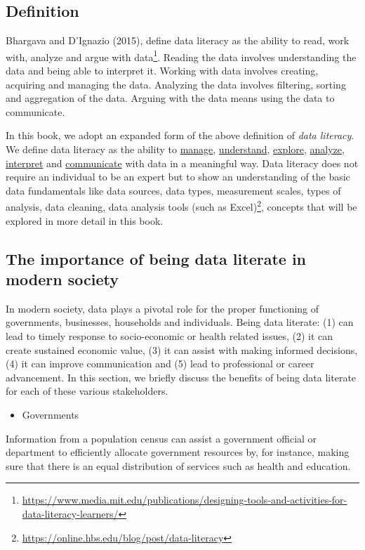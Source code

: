 \documentclass[
]{book}
\providecommand{\tightlist}{%
  \setlength{\itemsep}{0pt}\setlength{\parskip}{0pt}}
\begin{document}
\subsection{Definition}\label{definition}

Bhargava and D'Ignazio (2015), define data literacy as the ability to read, work with, analyze and argue with data\footnote{\url{https://www.media.mit.edu/publications/designing-tools-and-activities-for-data-literacy-learners/}}. Reading the data involves understanding the data and being able to interpret it. Working with data involves creating, acquiring and managing the data. Analyzing the data involves filtering, sorting and aggregation of the data. Arguing with the data means using the data to communicate.

In this book, we adopt an expanded form of the above definition of \emph{data literacy}. We define data literacy as the ability to \ul{manage}, \ul{understand}, \ul{explore}, \ul{analyze}, \ul{interpret} and \ul{communicate} with data in a meaningful way. Data literacy does not require an individual to be an expert but to show an understanding of the basic data fundamentals like data sources, data types, measurement scales, types of analysis, data cleaning, data analysis tools (such as Excel)\footnote{\url{https://online.hbs.edu/blog/post/data-literacy}}, concepts that will be explored in more detail in this book. ~

\subsection{The importance of being data literate in modern society}\label{the-importance-of-being-data-literate-in-modern-society}

In modern society, data plays a pivotal role for the proper functioning of governments, businesses, households and individuals. Being data literate: (1) can lead to timely response to socio-economic or health related issues, (2) it can create sustained economic value, (3) it can assist with making informed decisions, (4) it can improve communication and (5) lead to professional or career advancement. In this section, we briefly discuss the benefits of being data literate for each of these various stakeholders.

\begin{itemize}
\tightlist
\item
  Governments
\end{itemize}

Information from a population census can assist a government official or department to efficiently allocate government resources by, for instance, making sure that there is an equal distribution of services such as health and education.
\end{document}
